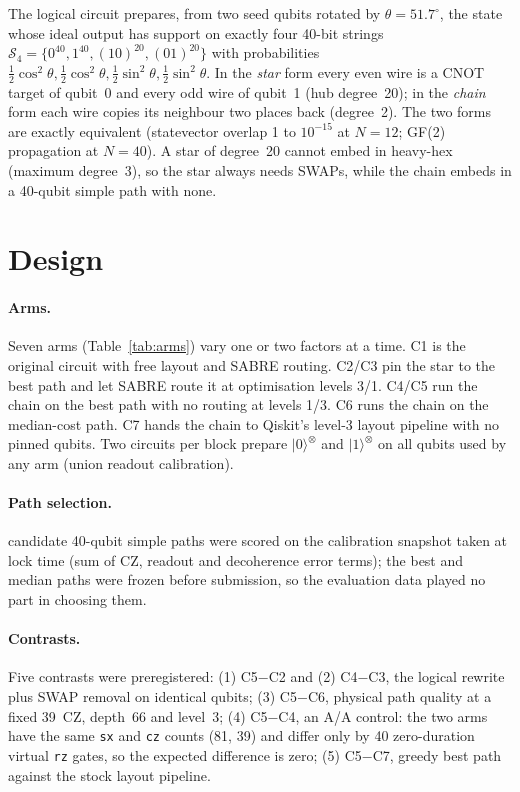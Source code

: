 \documentclass[10pt,twocolumn]{article}
\begin{document}
The logical circuit prepares, from two seed qubits rotated by $\theta=51.7^\circ$, the state whose
ideal output has support on exactly four 40-bit strings
$\mathcal{S}_4=\{0^{40},1^{40},(10)^{20},(01)^{20}\}$ with probabilities
$\tfrac12\cos^2\theta,\tfrac12\cos^2\theta,\tfrac12\sin^2\theta,\tfrac12\sin^2\theta$. In the
\emph{star} form every even wire is a CNOT target of qubit~0 and every odd wire of qubit~1 (hub
degree~20); in the \emph{chain} form each wire copies its neighbour two places back (degree~2). The
two forms are exactly equivalent (statevector overlap 1 to $10^{-15}$ at $N=12$; GF(2) propagation
at $N=40$). A star of degree~20 cannot embed in heavy-hex (maximum degree~3), so the star always
needs SWAPs, while the chain embeds in a 40-qubit simple path with none.

\section{Design}
\paragraph{Arms.} Seven arms (Table~\ref{tab:arms}) vary one or two factors at a time. C1 is the
original circuit with free layout and SABRE routing. C2/C3 pin the star to the best path and let
SABRE route it at optimisation levels 3/1. C4/C5 run the chain on the best path with no routing at
levels 1/3. C6 runs the chain on the median-cost path. C7 hands the chain to Qiskit's level-3 layout
pipeline with no pinned qubits. Two circuits per block prepare $|0\rangle^{\otimes}$ and
$|1\rangle^{\otimes}$ on all \UnionQubits{} qubits used by any arm (union readout calibration).

\paragraph{Path selection.} \NPaths{} candidate 40-qubit simple paths were scored on the
calibration snapshot taken at lock time (sum of CZ, readout and decoherence error terms); the best
and median paths were frozen before submission, so the evaluation data played no part in choosing
them.

\paragraph{Contrasts.} Five contrasts were preregistered:
(1) C5$-$C2 and (2) C4$-$C3, the logical rewrite plus SWAP removal on identical qubits;
(3) C5$-$C6, physical path quality at a fixed 39~CZ, depth~66 and level~3;
(4) C5$-$C4, an A/A control: the two arms have the same \texttt{sx} and \texttt{cz} counts (81, 39)
and differ only by 40 zero-duration virtual \texttt{rz} gates, so the expected difference is zero;
(5) C5$-$C7, greedy best path against the stock layout pipeline.
\end{document}
